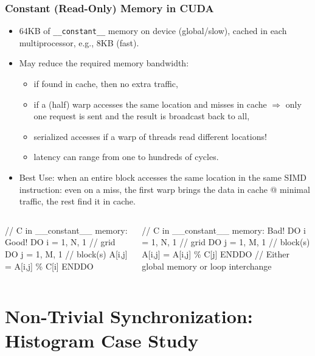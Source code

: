\documentclass{beamer}
\renewcommand{\emph}[1]{\textcolor{structure}{#1}}
\newcommand{\emp}[1]{\textcolor{DikuRed}{ #1}}
\newcommand{\emphh}[1]{\textcolor{CosGreen}{ #1}}
\begin{document}
\begin{frame}[fragile,t]
  \frametitle{Constant (Read-Only) Memory in CUDA} 

\begin{itemize}
    \item 64KB of {\tt \_\_constant\_\_} memory on device (global/slow), 
            cached in each multiprocessor, e.g., 8KB (fast).\smallskip
    \item May reduce the required memory bandwidth:
            \begin{itemize}
                \item if found in cache, then no extra traffic,
                \item if a (half) warp accesses the same location and 
                        misses in cache $\Rightarrow$
                        only one request is sent and the result is
                        broadcast back to all,
                \item \alert{serialized} accesses if a warp of threads
                        read different locations!
                \item latency can range from one to hundreds of cycles.
            \end{itemize}\smallskip
    \item \emph{Best Use: when an entire block accesses 
                the same location in the same SIMD instruction}:
            even on a miss, the first warp brings the data in cache @ minimal traffic,
            the rest find it in cache. 
\end  {itemize}

\begin{columns}
\begin{colorcode}[fontsize=\scriptsize]
// \emphh{C in __constant__ memory: Good!}
DO i = 1, N, 1   \emp{// grid}
  DO j = 1, M, 1 \emp{// block(s)}
    A[i,j] = A[i,j] \% C[i]
ENDDO
\end{colorcode}
\begin{colorcode}[fontsize=\scriptsize]
// \alert{C in __constant__ memory: Bad!}
DO i = 1, N, 1   \emp{// grid}
  DO j = 1, M, 1 \emp{// block(s)}
    A[i,j] = A[i,j] \% C[j]
ENDDO
// \emphh{Either global memory or loop interchange}
\end{colorcode}
\end{columns}
\end{frame}


\section{Non-Trivial Synchronization: Histogram Case Study}
\begin{frame}[fragile]
	\tableofcontents[currentsection]
\end{frame}
\end{document}
